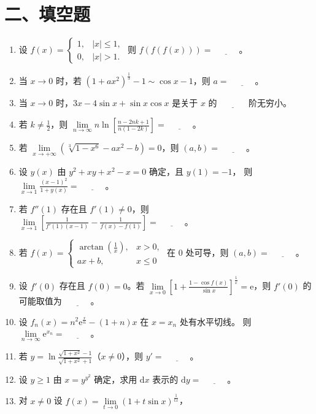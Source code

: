 \documentclass[UTF8,a4paper,zihao=-4,fontset=fandol]{ctexart}
\renewcommand{\lim}{\operatorname*{lim}\limits}
\newcommand{\blank}{\underline{\hspace{3em}}}
\begin{document}
\section*{二、填空题}
\begin{enumerate}[start=22]
\item 设 $f(x)=\begin{cases}1,&|x|\le1,\\0,&|x|>1.\end{cases}$ 则 $f(f(f(x)))=\blank$。
\item 当 $x\to0$ 时，若 $(1+ax^2)^{\frac{1}{3}}-1\sim\cos x-1$，则 $a=\blank$。
\item 当 $x\to0$ 时，$3x-4\sin x+\sin x\cos x$ 是关于 $x$ 的 $\blank$ 阶无穷小。
\item 若 $k\ne\frac{1}{2}$，则 $\displaystyle\lim_{n\to\infty}
  n\ln\left[\frac{n-2nk+1}{n(1-2k)}\right]=\blank$。
\item 若 $\displaystyle\lim_{x\to+\infty}(\sqrt[3]{1-x^6}-ax^2-b)=0$，则 $(a,b)=\blank$。
\item 设 $y(x)$ 由 $y^2+xy+x^2-x=0$ 确定，且 $y(1)=-1$，
则 $\displaystyle\lim_{x\to1}\frac{(x-1)^2}{1+y(x)}=\blank$。
\item 若 $f''(1)$ 存在且 $f'(1)\ne0$，则 $\displaystyle\lim_{x\to1}
\left[\frac1{f'(1)(x-1)}-\frac1{f(x)-f(1)}\right]=\blank$。
\item 若 $f(x)=\begin{cases}\arctan(\frac{1}{x}),&x>0,\\ax+b,&x\le0\end{cases}$
在 $0$ 处可导，则 $(a,b)=\blank$。
\item 设 $f'(0)$ 存在且 $f(0)=0$。若 $\displaystyle\lim_{x\to0}
\left[1+\frac{1-\cos f(x)}{\sin x}\right]^{\frac{1}{x}}=\mathrm e$，则 $f'(0)$ 的可能取值为 $\blank$。
\item 设 $f_n(x)=n^2\mathrm{e}^{\frac{x}{n}}-(1+n)x$ 在 $x=x_n$ 处有水平切线。
则 $\displaystyle\lim_{n\to\infty}\mathrm{e}^{x_n}=\blank$。
\item 若 $\displaystyle y=\ln\frac{\sqrt{1+x^2}-1}{\sqrt{1+x^2}+1}$（$x\ne0$），则 $y'=\blank$。
\item 设 $y\ge1$ 由 $x=y^{y^2}$ 确定，求用 $\mathrm{d}x$ 表示的 $\mathrm{d}y=\blank$。
\item 对 $x\ne0$ 设 $\displaystyle f(x)=\lim_{t\to0}(1+t\sin x)^{\frac{1}{tx}}$，

\end{enumerate}
\end{document}

